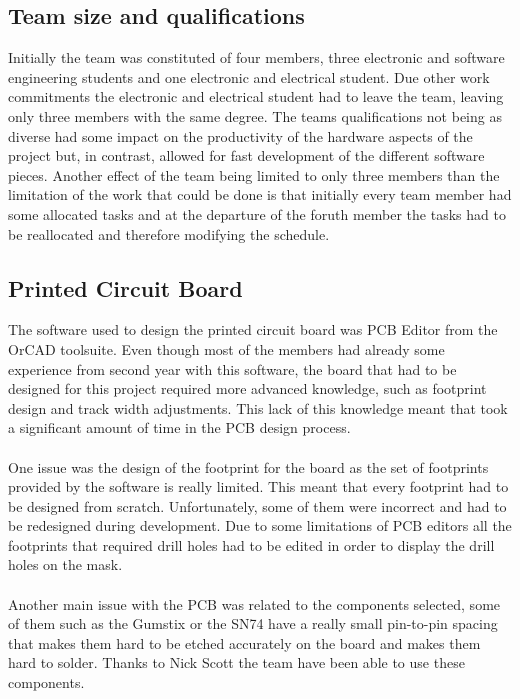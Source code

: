 \documentclass[11pt]{report} %
\begin{document}
	\subsection{Team size and qualifications}
	Initially the team was constituted of four members, three electronic and 
	software engineering students and one electronic and electrical student.
	Due other work commitments the electronic and electrical student had to leave the
	team,  leaving only three members with the same degree. The teams 
	qualifications not being as diverse had some impact on the productivity of the
	hardware aspects of the project but, in contrast, allowed for fast development
	of the different software pieces. Another effect of the team being limited to only
	three members than the limitation of the work that could be done is that
	initially every team member had some allocated tasks and at the departure
	of the foruth member the tasks had to be reallocated and therefore modifying
	the schedule.

	\subsection{Printed Circuit Board}
	The software used to design the printed circuit board was PCB Editor from the
	OrCAD toolsuite. Even though most of the members had already some experience from
	second year with this software, the board that had to be designed for this
	project required more advanced knowledge, such as footprint design and track
	width adjustments. This lack of this knowledge meant that took a significant amount of time
	in the PCB design process.\\
	\\
	One issue was the design of the footprint for the board as the set of 
	footprints provided by the software is really limited.
	This meant that every footprint had to
	be designed from scratch.
	Unfortunately, some of them were incorrect and had to be redesigned during
	development. Due to
	some limitations of PCB editors all the footprints that required drill holes
	had to be edited in order to display the drill holes on the mask.\\
	\\
	Another main issue with the PCB was related to the components selected, some
	of them such as the Gumstix or the SN74 have a really small pin-to-pin spacing
	that makes them hard to be etched accurately on the board and makes them
	hard to solder. Thanks to Nick Scott the team have been able to use these
	components.
\end{document}
